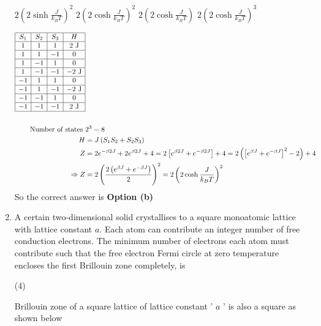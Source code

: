 \begin{enumerate}
\begin{tasks}
	\task[\textbf{a.}]$2\left(2 \sinh \frac{J}{k_{B} T}\right)^{2}$
	\task[\textbf{b.}]$2\left(2 \cosh \frac{J}{k_{B} T}\right)^{2}$
	\task[\textbf{c.}]$2\left(2 \cosh \frac{J}{k_{B} T}\right)$
	\task[\textbf{d.}] $2\left(2 \cosh \frac{J}{k_{B} T}\right)^{3}$
\end{tasks}
\begin{answer}
	\begin{align*}
	\begin{array}{|c|c|c|c|}
	\hline S_{1} & S_{2} & S_{3} & H \\
	\hline 1 & 1 & 1 & 2 \mathrm{~J} \\
	\hline 1 & 1 & -1 & 0 \\
	\hline 1 & -1 & 1 & 0 \\
	\hline 1 & -1 & -1 & -2 \mathrm{~J} \\
	\hline-1 & 1 & 1 & 0 \\
	\hline-1 & 1 & -1 & -2 \mathrm{~J} \\
	\hline-1 & -1 & 1 & 0 \\
	\hline-1 & -1 & -1 & 2 \mathrm{~J} \\
	\hline
	\end{array}\\\\
	\text{Number of states }&2^{3}=8\\
	H&=J\left(S_{1} S_{2}+S_{2} S_{3}\right) \\
	Z&=2 e^{-\beta 2 J}+2 e^{\beta 2 J}+4=2\left[e^{\beta 2 J}+e^{-\beta 2 J}\right]+4=2\left(\left[e^{\beta J}+e^{-\beta J}\right]^{2}-2\right)+4 \\
	\Rightarrow Z&=2\left(\frac{2\left(e^{\beta J}+e^{-\beta J}\right)}{2}\right)^{2}=2\left(2 \cosh \frac{J}{k_{B} T}\right)^{2}
	\end{align*}
	So the correct answer is \textbf{Option (b)}
\end{answer}
\item  A certain two-dimensional solid crystallises to a square monoatomic lattice with lattice constant $a$. Each atom can contribute an integer number of free conduction electrons. The minimum number of electrons each atom must contribute such that the free electron Fermi circle at zero temperature encloses the first Brillouin zone completely, is
 \begin{tasks}(4)
\end{tasks}
\begin{answer}
	Brillouin zone of a square lattice of lattice constant ' $a$ ' is also a square as shown below\\

\end{answer}
\end{enumerate}
